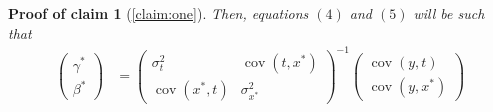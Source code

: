 \documentclass[10pt]{article}
\newtheorem{claimproof}{Proof of claim}[claim]
\begin{document}
        \begin{claimproof}[\ref{claim:one}]

        Then, equations $(4)$ and $(5)$ will be such that
                    \begin{align}
                            \left(\begin{array}{l}
                        {\gamma}^* \\
                        {\beta}^*
                        \end{array}\right)&=\left(\begin{array}{cc}
                        {\sigma}^2_{t} & \operatorname{cov}({t,x^*}) \\
                        \operatorname{cov}({x^*,t}) & {\sigma}_{x^*}^2
                        \end{array}\right)^{-1}\left(\begin{array}{c}
                        \operatorname{cov}{(y,t)} \\
                        \operatorname{cov}{(y,x^*)}
                        \end{array}\right) \\
                        \end{align}
                
        \end{claimproof}	
        
\end{document}
